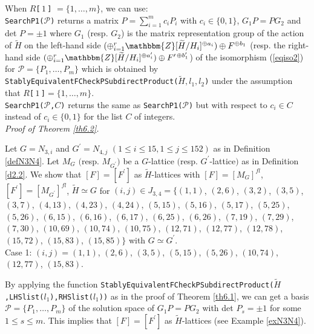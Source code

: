 \documentclass{amsart}
\theoremstyle{plain}
\theoremstyle{definition}
\theoremstyle{remark}
\newcommand{\bZ}{\mathbbm{Z}}\newcommand{\bQ}{\mathbbm{Q}}
\begin{document}
When $R${\tt [}\,$1$\,{\tt ]} $=\{1,\ldots,m\}$, 
we can use:\\

\noindent 
{\tt SearchP1($\mathcal{P}$)} 
returns a matrix $P=\sum_{i=1}^m c_i P_i$ 
with $c_i\in\{0,1\}$, $G_1P=PG_2$ and det $P=\pm 1$ 
where $G_1$ (resp. $G_2$) is the matrix representation group of the action of 
$\widetilde{H}$ 
on the left-hand side $(\oplus_{i=1}^r \bZ[\widetilde{H}/H_i]^{\oplus a_i})\oplus F^{\oplus b_1}$ 
(resp. the right-hand side 
$(\oplus_{i=1}^r \bZ[\widetilde{H}/H_i]^{\oplus a_i^{\prime}})\oplus F^{\prime\,\oplus b_1^{\prime}}$) 
of the isomorphism (\ref{eqiso2}) 
for $\mathcal{P}=\{P_1,\ldots,P_m\}$ which is obtained by 
{\tt StablyEquivalentFCheckPSubdirectProduct($\widetilde{H},l_1,l_2$)} 
under the assumption that 
$R${\tt [}\,$1$\,{\tt ]}$=\{1,\ldots,m\}$.\\

\noindent 
{\tt SearchP1($\mathcal{P}$,$C$)} returns the same as 
{\tt SearchP1($\mathcal{P}$)} 
but with respect to $c_i\in C$ instead of $c_i\in\{0,1\}$ 
for the list $C$ of integers.\\

{\it Proof of Theorem \ref{th6.2}.}


Let $G=N_{3,i}$ and $G^\prime=N_{4,j}$ $(1\leq i\leq 15, 1\leq j\leq 152)$ 
as in Definition \ref{defN3N4}. 
Let $M_{G}$ $($resp. $M_{G^\prime}$$)$ be a $G$-lattice 
$($resp. $G^\prime$-lattice$)$ as in Definition \ref{d2.2}. 
We show that $[F]=[F^\prime]$ as $\widetilde{H}$-lattices 
with $[F]=[M_G]^{fl}$, $[F^\prime]=[M_{G^\prime}]^{fl}$, 
$\widetilde{H}\simeq G$ 
for $(i,j)\in J_{3,4}=\{(1,1)$, $(2,6)$, $(3,2)$, $(3,5)$, $(3,7)$, $(4,13)$,
$(4,23)$, $(4,24)$, $(5,15)$, $(5,16)$, $(5,17)$, $(5,25)$, $(5,26)$,
$(6,15)$, $(6,16)$, $(6,17)$, $(6,25)$, $(6,26)$, $(7,19)$, $(7,29)$,
$(7,30)$, $(10,69)$, $(10,74)$, $(10,75)$, $(12,71)$, $(12,77)$,
$(12,78)$, $(15,72)$, $(15,83)$, $(15,85)\}$ with $G\simeq G^\prime$.\\

Case 1: $(i,j)=(1,1)$, $(2,6)$, $(3,5)$, $(5,15)$, $(5,26)$, 
$(10,74)$, $(12,77)$, $(15,83)$. 

By applying the function 
{\tt StablyEquivalentFCheckPSubdirectProduct($\widetilde{H}$,LHSlist($l_1$),RHSlist($l_1$))} as in the proof of Theorem \ref{th6.1}, 
we can get a basis $\mathcal{P}=\{P_1,\dots,P_m\}$ 
of the solution space of $G_1P=PG_2$ 
with det $P_s=\pm 1$ for some $1\leq s\leq m$. 
This implies that $[F]=[F^\prime]$ as $\widetilde{H}$-lattices 
(see Example \ref{exN3N4}).\\
\end{document}
